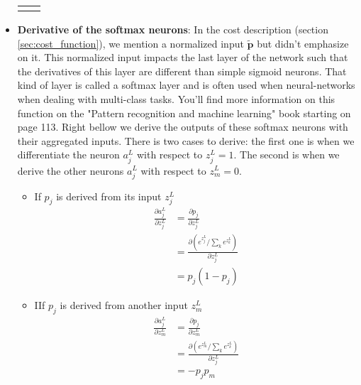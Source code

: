 \begin{itemize}
\begin{tabular}{c|c}
{\begin{equation}
							\end{equation}
						}
					\end{tabular}
				\item \textbf{Derivative of the softmax neurons}: In the cost description (section \ref{sec:cost_function}), we mention a normalized input $\widetilde{\boldsymbol{p}}$ but didn't emphasize on it. This normalized input impacts the last layer of the network such that the derivatives of this layer are different than simple sigmoid neurons. That kind of layer is called a softmax layer and is often used when neural-networks when dealing with multi-class tasks. You'll find more information on this function on the "Pattern recognition and machine learning" book \cite{bishop2006pattern} starting on page 113. Right bellow we derive the outputs of these softmax neurons with their aggregated inputs. There is two cases to derive: the first one is when we differentiate the neuron $a^L_j$ with respect to $z^L_j=1$. The second is when we derive the other neurons $a^L_j$ with respect to $z^L_m=0$.
				\begin{itemize}
					\item If $p_j$ is derived from its input $z^L_j$
						\begin{equation}
							\label{eq:softmax_deriv_1}
							\begin{split}
								\frac{\partial a^L_j}{\partial z^L_j}
								&= \frac{\partial p_j}{\partial z^L_j} \\
								&= \frac{\partial (e^{z^L_j}/\sum_k e^{z^L_k})}{ \partial z^L_j} \\
								&= p_j (1-p_j)
							\end{split}
						\end{equation}
					\item IIf $p_j$ is derived from another input $z^L_m$
						\begin{equation}
							\label{eq:softmax_deriv_2}
							\begin{split}
								\frac{\partial a^L_j}{\partial z^L_m}
								&= \frac{\partial p_j}{\partial z^L_m}\\
								&= \frac{\partial (e^{z^L_m}/\sum_k e^{z^L_k})}{ \partial z^L_j} \\
								&= -p_j p_m
							\end{split}
						\end{equation}
				\end{itemize}
			\end{itemize}

